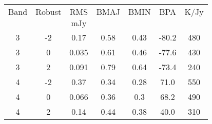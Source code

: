 \begin{table*}[htp]
\begin{tabular}{ccccccc}
\label{tab:contsensitivity}
Band & Robust & RMS & BMAJ & BMIN & BPA & K/Jy \\
 &  & $\mathrm{mJy}$ &  &  &  &  \\
\hline
3 & -2 & 0.17 & 0.58 & 0.43 & -80.2 & 480 \\
3 & 0 & 0.035 & 0.61 & 0.46 & -77.6 & 430 \\
3 & 2 & 0.091 & 0.79 & 0.64 & -73.4 & 240 \\
4 & -2 & 0.37 & 0.34 & 0.28 & 71.0 & 550 \\
4 & 0 & 0.066 & 0.36 & 0.3 & 68.2 & 490 \\
4 & 2 & 0.14 & 0.44 & 0.38 & 40.0 & 310 \\
\hline
\end{tabular}
\end{table*}
